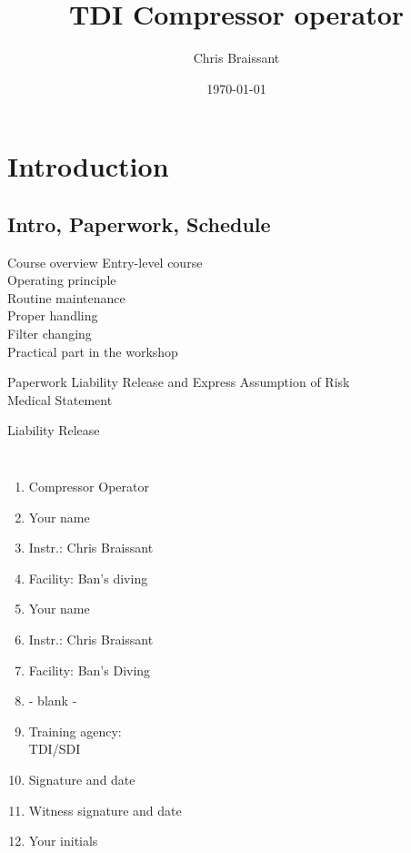 \documentclass[aspectratio=1610,english,12pt]{beamer}
\author[]{Chris Braissant}
\title[]{TDI Compressor operator}
\institute{Ban's Diving Resort}
\date{\today}
\begin{document}
\begin{frame}[plain]
	\maketitle
\end{frame}


\section{Introduction}

\subsection{Intro, Paperwork, Schedule}

\begin{frame}{Course overview}
	Entry-level course\\
	Operating principle\\
	Routine maintenance\\
	Proper handling\\
	Filter changing\\
	Practical part in the workshop\\
\end{frame}

\begin{frame}{Paperwork}
	Liability Release and Express Assumption of Risk\\
	Medical Statement
\end{frame}

\begin{frame}{Liability Release}
	\begin{columns}[onlytextwidth]
			\begin{enumerate}\itemsep0em 
				\item Compressor Operator
				\item Your name
				\item Instr.: Chris Braissant
				\item Facility: Ban's diving
				\item Your name
				\item Instr.: Chris Braissant
				\item Facility: Ban's Diving
				\item - blank -
				\item Training agency:\\TDI/SDI
				\item Signature and date
				\item Witness signature and date
				\item Your initials
			\end{enumerate}
	\end{columns}
\end{frame}
\end{document}
